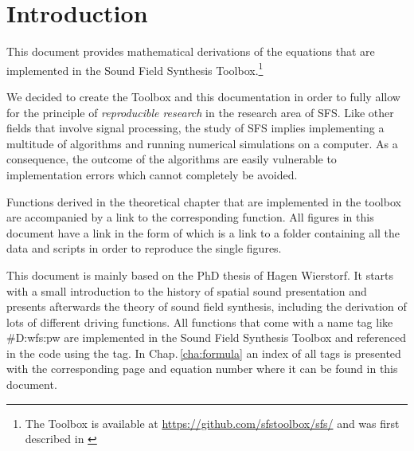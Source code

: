 \def \GITHUB {\GITHUBBASE/01_introduction}
\graphicspath{%
{\PATH/\CHAPONE/}%
{\PATH/\CHAPONE/fig1_01/}%
{\PATH/\CHAPONE/fig1_02/}%
{\PATH/\CHAPONE/fig1_03/}%
{\PATH/\CHAPONE/fig1_04/}%
}

\chapter{Introduction}
\label{cha:introduction}
%
This document provides mathematical derivations of the equations that are
implemented in the Sound Field Synthesis Toolbox.\footnote{The Toolbox is
available at
\href{https://github.com/sfstoolbox/sfs/}{\color{link}https://github.com/sfstoolbox/sfs/}
and was first described in
\cite{Wierstorf2012a}}

We decided to create the Toolbox and this documentation in order to fully allow
for the principle of \emph{reproducible research}\cite[For one of the
pioneers see][]{Donoho2009} in the research area of \ac{SFS}.
Like other fields that involve signal processing, the study of \ac{SFS}
implies implementing a multitude of algorithms and running numerical simulations
on a computer.
As a consequence, the outcome of the algorithms are easily vulnerable to
implementation errors which cannot completely be
avoided.\cite[Compare][]{Ince2012}

Functions derived in the theoretical chapter that are implemented in the
toolbox are accompanied by a link to the corresponding function. All figures in
this document have a link in the form of \reproduce{\GITHUBBASE} which is a link to a
folder containing all the data and scripts in order to reproduce the single
figures.

This document is mainly based on the PhD thesis of Hagen
Wierstorf.\cite{Wierstorf2014} It starts with a small introduction to the
history of spatial sound presentation and presents afterwards the theory of
sound field synthesis, including the derivation of lots of different driving
functions. All functions that come with a name tag like \#D:wfs:pw are
implemented in the Sound Field Synthesis Toolbox and referenced in the code
using the tag. In Chap.\,\ref{cha:formula} an index of all tags is presented
with the corresponding page and equation number where it can be found in this
document.


